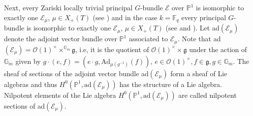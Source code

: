 \documentclass{amsart}
\newcommand{\cE}{\mathcal{E}}
\newcommand{\gm}{\mathbb{G}_{m}}
\theoremstyle{plain}
\theoremstyle{definition}
\theoremstyle{remark}
\begin{document}
Next, every Zariski locally trivial principal $G$-bundle $\cE$ over $\mathbb{P}^{1}$ is isomorphic to exactly one $\cE_{\mu}$, $\mu\in X_{+}(T)$ (see \cite[Theorem 4.2]{Ra}) and in the case $k=\mathbb{F}_{q}$ every principal $G$-bundle is isomorphic to exactly one $\cE_{\mu}$, $\mu\in X_{+}(T)$ (see \cite[Theorem 3.8a)]{Gi} and \cite{La}). Let ad$(\cE_{\mu})$ denote the adjoint vector bundle over $\mathbb{P}^1$ associated to $\cE_\mu$. Note that ad$(\cE_\mu)=\mathcal{O}(1)^{\times}\times^{\mathbb{G}_{m}}\mathfrak{g}$, i.e, it is the quotient of $\mathcal{O}(1)^{\times}\times\mathfrak{g}$ under the action of $\gm$ given by $g\cdot(e,f)=(e\cdot g,\text{Ad}_{\mu(g^{-1})}(f))$, $e\in\mathcal{O}(1)^{\times},f\in\mathfrak{g},g\in\gm$. The sheaf of sections of the adjoint vector bundle ad$(\cE_{\mu})$ form a sheaf of Lie algebras and thus $H^{0}(\mathbb{P}^{1},\text{ad}(\cE_{\mu}))$ has the structure of a Lie algebra. Nilpotent elements of the Lie algebra $H^{0}(\mathbb{P}^{1},\text{ad}(\cE_{\mu}))$ are called nilpotent sections of ad$(\cE_{\mu})$.
\end{document}
